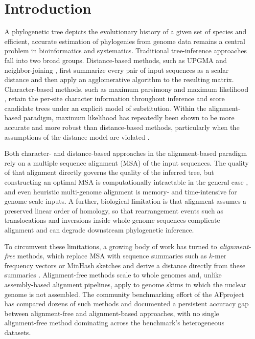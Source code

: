 \section{Introduction}

A phylogenetic tree depicts the evolutionary history of a given set of species
and efficient, accurate estimation of phylogenies from genome data remains a
central problem in bioinformatics and systematics. Traditional tree-inference
approaches fall into two broad groups. Distance-based methods, such as UPGMA
\citep{sokal1958upgma} and neighbor-joining \citep{saitou1987nj}, first
summarize every pair of input sequences as a scalar distance and then apply an
agglomerative algorithm to the resulting matrix. Character-based methods, such
as maximum parsimony \citep{fitch1971parsimony} and maximum likelihood
\citep{felsenstein1981ml, posada2021felsenstein}, retain the per-site character
information throughout inference and score candidate trees under an explicit
model of substitution. Within the alignment-based paradigm, maximum likelihood
has repeatedly been shown to be more accurate and more robust than
distance-based methods, particularly when the assumptions of the distance
model are violated \citep{felsenstein1981ml, posada2021felsenstein}.

Both character- and distance-based approaches in the alignment-based paradigm
rely on a multiple sequence alignment (MSA) of the input sequences. The
quality of that alignment directly governs the quality of the inferred tree,
but constructing an optimal MSA is computationally intractable in the general
case \citep{elias2006msa}, and even heuristic multi-genome alignment is
memory- and time-intensive for genome-scale inputs. A further, biological
limitation is that alignment assumes a preserved linear order of homology, so
that rearrangement events such as translocations and inversions inside
whole-genome sequences complicate alignment and can degrade downstream
phylogenetic inference.

To circumvent these limitations, a growing body of work has turned to
\emph{alignment-free} methods, which replace MSA with sequence summaries such
as $k$-mer frequency vectors or MinHash sketches and derive a distance
directly from these summaries \citep{vinga2003review, zielezinski2017review}.
Alignment-free methods scale to whole genomes and, unlike assembly-based
alignment pipelines, apply to genome skims in which the nuclear genome is not
assembled. The community benchmarking effort of the AFproject
\citep{zielezinski2019afproject} has compared dozens of such methods and
documented a persistent accuracy gap between alignment-free and alignment-based
approaches, with no single alignment-free method dominating across the
benchmark's heterogeneous datasets.

